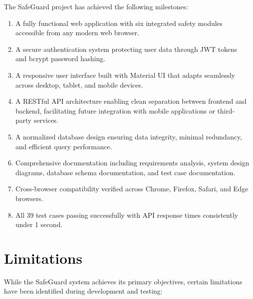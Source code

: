 The SafeGuard project has achieved the following milestones:

\begin{enumerate}[label=\arabic*.]
  \item A fully functional web application with six integrated safety modules accessible from any modern web browser.

  \item A secure authentication system protecting user data through JWT tokens and bcrypt password hashing.

  \item A responsive user interface built with Material UI that adapts seamlessly across desktop, tablet, and mobile devices.

  \item A RESTful API architecture enabling clean separation between frontend and backend, facilitating future integration with mobile applications or third-party services.

  \item A normalized database design ensuring data integrity, minimal redundancy, and efficient query performance.

  \item Comprehensive documentation including requirements analysis, system design diagrams, database schema documentation, and test case documentation.

  \item Cross-browser compatibility verified across Chrome, Firefox, Safari, and Edge browsers.

  \item All 39 test cases passing successfully with API response times consistently under 1 second.
\end{enumerate}

\section{Limitations}

While the SafeGuard system achieves its primary objectives, certain limitations have been identified during development and testing:

